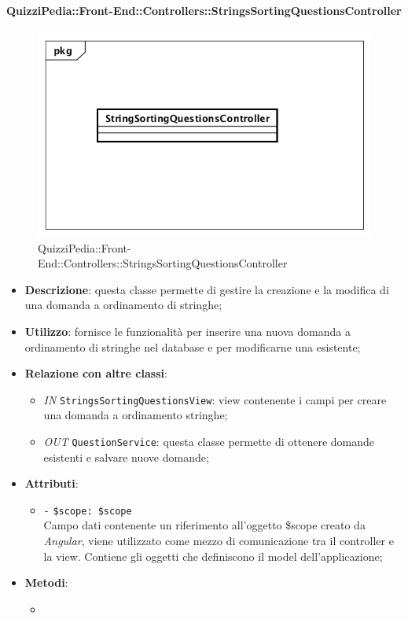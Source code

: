 \paragraph{QuizziPedia::Front-End::Controllers::StringsSortingQuestionsController}
\begin{figure} [ht]
	\centering
	\includegraphics[scale=0.45]{UML/Classi/Front-End/QuizziPedia_Front-end_Controller_StringSortingQuestionsController.png}
	\caption{QuizziPedia::Front-End::Controllers::StringsSortingQuestionsController}
\end{figure} \FloatBarrier
\begin{itemize}
	\item \textbf{Descrizione}: questa classe permette di gestire la creazione e la modifica di una domanda a ordinamento di stringhe;
	\item \textbf{Utilizzo}: fornisce le funzionalità per inserire una nuova domanda a ordinamento di stringhe nel database e per modificarne una esistente;
	\item \textbf{Relazione con altre classi}:
	\begin{itemize}
		\item \textit{IN} \texttt{StringsSortingQuestionsView}: view contenente i campi per creare una domanda a ordinamento stringhe; 
		\item \textit{OUT} \texttt{QuestionService}: questa classe permette di ottenere domande esistenti e salvare nuove domande;
	\end{itemize}
	\item \textbf{Attributi}:
	\begin{itemize}
		\item \texttt{-} \texttt{\$scope: \$scope} \\
		Campo dati contenente un riferimento all’oggetto \$scope creato da \textit{Angular}, viene utilizzato come mezzo di comunicazione tra il controller e la view. Contiene gli oggetti che definiscono il model dell’applicazione;
	\end{itemize}
	\item \textbf{Metodi}:
	\begin{itemize}
		\item 
	\end{itemize}
\end{itemize}

